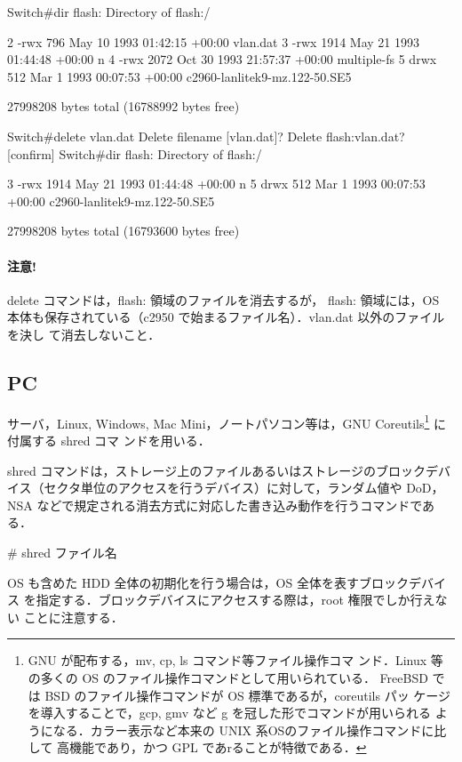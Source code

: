 \begin{cli}
Switch#dir flash:
Directory of flash:/

    2  -rwx         796  May 10 1993 01:42:15 +00:00  vlan.dat
    3  -rwx        1914  May 21 1993 01:44:48 +00:00  n
    4  -rwx        2072  Oct 30 1993 21:57:37 +00:00  multiple-fs
    5  drwx         512   Mar 1 1993 00:07:53 +00:00  c2960-lanlitek9-mz.122-50.SE5

27998208 bytes total (16788992 bytes free)

Switch#delete vlan.dat
Delete filename [vlan.dat]?
Delete flash:vlan.dat? [confirm]
Switch#dir flash:
Directory of flash:/

    3  -rwx        1914  May 21 1993 01:44:48 +00:00  n
    5  drwx         512   Mar 1 1993 00:07:53 +00:00  c2960-lanlitek9-mz.122-50.SE5

27998208 bytes total (16793600 bytes free)
\end{cli}

\paragraph{注意!} 
delete コマンドは，flash: 領域のファイルを消去するが，
flash: 領域には，OS 本体も保存されている（c2950 で始まるファイル名）．vlan.dat 以外のファイルを決し
て消去しないこと．

\subsection*{PC}

サーバ，Linux, Windows, Mac Mini，ノートパソコン等は，GNU
Coreutils\footnote{GNU が配布する，mv, cp, ls コマンド等ファイル操作コマ
ンド．Linux 等の多くの OS のファイル操作コマンドとして用いられている．
FreeBSD では BSD のファイル操作コマンドが OS 標準であるが，coreutils パッ
ケージを導入することで，gcp, gmv など g を冠した形でコマンドが用いられる
ようになる．カラー表示など本来の UNIX 系OSのファイル操作コマンドに比して
高機能であり，かつ GPL であrることが特徴である．} に付属する shred コマ
ンドを用いる．

shred コマンドは，ストレージ上のファイルあるいはストレージのブロックデバ
イス（セクタ単位のアクセスを行うデバイス）に対して，ランダム値や DoD，
NSA などで規定される消去方式に対応した書き込み動作を行うコマンドである．

\begin{cli}
# shred ファイル名
\end{cli}

OS も含めた HDD 全体の初期化を行う場合は，OS 全体を表すブロックデバイス
を指定する．ブロックデバイスにアクセスする際は，root 権限でしか行えない
ことに注意する．


